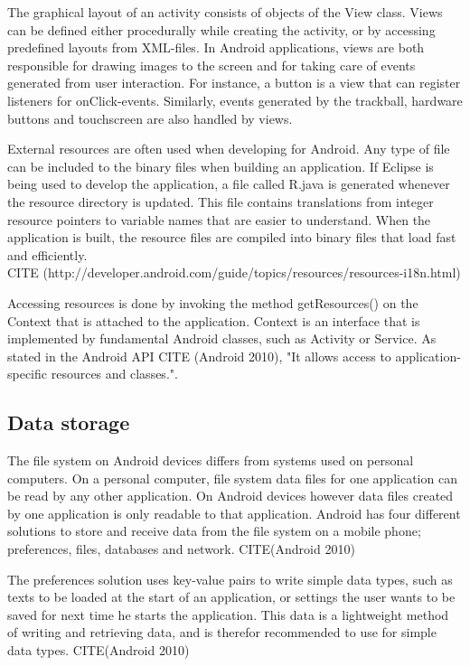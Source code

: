 The graphical layout of an activity consists of objects of the View class. Views can be defined either procedurally while creating the activity, or by accessing predefined layouts from XML-files. In Android applications, views are both responsible for drawing images to the screen and for taking care of events generated from user interaction. For instance, a button is a view that can register listeners for onClick-events. Similarly, events generated by the trackball, hardware buttons and touchscreen are also handled by views.

External resources are often used when developing for Android. Any type of file can be included to the binary files when building an application. If Eclipse is being used to develop the application, a file called R.java is generated whenever the resource directory is updated. This file contains translations from integer resource pointers to variable names that are easier to understand. When the application is built, the resource files are compiled into binary files that load fast and efficiently. \\ CITE (http://developer.android.com/guide/topics/resources/resources-i18n.html)

Accessing resources is done by invoking the method getResources() on the Context that is attached to the application. Context is an interface that is implemented by fundamental Android classes, such as Activity or Service. As stated in the Android API CITE (Android 2010), "It allows access to application-specific resources and classes.".

\subsection{Data storage}

The file system on Android devices differs from systems used on personal computers. On a personal computer, file system data files for one application can be read by any other application. On Android devices however data files created by one application is only readable to that application. Android has four different solutions to store and receive data from the file system on a mobile phone; preferences, files, databases and network. CITE(Android 2010) 

The preferences solution uses key-value pairs to write simple data types, such as texts to be loaded at the start of an application, or settings the user wants to be saved for next time he starts the application. This data is a lightweight method of writing and retrieving data, and is therefor recommended to use for simple data types. CITE(Android 2010)

